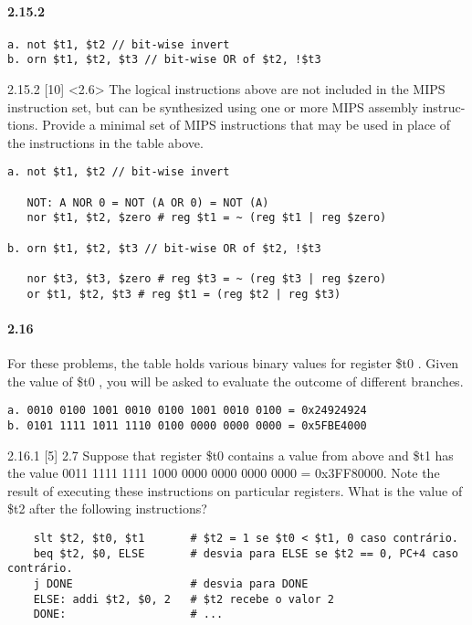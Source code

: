 \documentclass{article}
\begin{document}
\paragraph{2.15.2}

\begin{verbatim}
a. not $t1, $t2 // bit-wise invert
b. orn $t1, $t2, $t3 // bit-wise OR of $t2, !$t3
\end{verbatim}

2.15.2  [10] <2.6> The logical instructions above are not included in the MIPS
instruction set, but can be synthesized using one or more MIPS assembly instruc-
tions. Provide a minimal set of MIPS instructions that may be used in place of
the instructions in the table above.

\begin{verbatim}
a. not $t1, $t2 // bit-wise invert

   NOT: A NOR 0 = NOT (A OR 0) = NOT (A)
   nor $t1, $t2, $zero # reg $t1 = ~ (reg $t1 | reg $zero)

b. orn $t1, $t2, $t3 // bit-wise OR of $t2, !$t3

   nor $t3, $t3, $zero # reg $t3 = ~ (reg $t3 | reg $zero)
   or $t1, $t2, $t3 # reg $t1 = (reg $t2 | reg $t3)

\end{verbatim}

\paragraph{2.16}
For these problems, the table holds various binary values for register \$t0 .
Given the value of \$t0 , you will be asked to evaluate the outcome of
different branches.

\begin{verbatim}
a. 0010 0100 1001 0010 0100 1001 0010 0100 = 0x24924924
b. 0101 1111 1011 1110 0100 0000 0000 0000 = 0x5FBE4000
\end{verbatim}

2.16.1 [5] 2.7 Suppose that register \$t0 contains a value from above and \$t1
has the value 0011 1111 1111 1000 0000 0000 0000 0000 = 0x3FF80000. Note the
result of executing these instructions on particular registers. What is the
value of \$t2 after the following instructions?

  \begin{verbatim}
    slt $t2, $t0, $t1       # $t2 = 1 se $t0 < $t1, 0 caso contrário.
    beq $t2, $0, ELSE       # desvia para ELSE se $t2 == 0, PC+4 caso contrário.
    j DONE                  # desvia para DONE
    ELSE: addi $t2, $0, 2   # $t2 recebe o valor 2
    DONE:                   # ...
  \end{verbatim}
\end{document}
